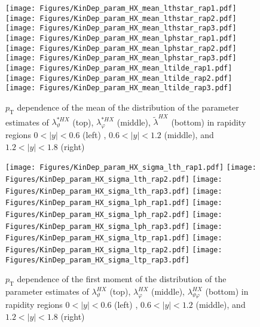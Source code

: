 \documentclass[12pt]{article}
\newcommand{\pT}{p_\mathrm{T}}
\newcommand{\absy}{\left |  y \right |}
\newcommand{\lamthHX}{\lambda^{\scriptscriptstyle HX}_\vartheta}
\newcommand{\lamphHX}{\lambda^{\scriptscriptstyle HX}_\varphi}
\newcommand{\lamthphHX}{\lambda^{\scriptscriptstyle HX}_{\vartheta \varphi}}
\newcommand{\lamtildeHX}{\tilde{\lambda}^{\scriptscriptstyle HX}}
\newcommand{\lamthstarHX}{\lambda^{* \scriptscriptstyle HX}_\vartheta}
\newcommand{\lamphstarHX}{\lambda^{* \scriptscriptstyle HX}_\varphi}
\begin{document}
\begin{figure}[htbp]
\centering
\texttt{[image: Figures/KinDep\_param\_HX\_mean\_lthstar\_rap1.pdf]}
\texttt{[image: Figures/KinDep\_param\_HX\_mean\_lthstar\_rap2.pdf]}
\texttt{[image: Figures/KinDep\_param\_HX\_mean\_lthstar\_rap3.pdf]}
\texttt{[image: Figures/KinDep\_param\_HX\_mean\_lphstar\_rap1.pdf]}
\texttt{[image: Figures/KinDep\_param\_HX\_mean\_lphstar\_rap2.pdf]}
\texttt{[image: Figures/KinDep\_param\_HX\_mean\_lphstar\_rap3.pdf]}
\texttt{[image: Figures/KinDep\_param\_HX\_mean\_ltilde\_rap1.pdf]}
\texttt{[image: Figures/KinDep\_param\_HX\_mean\_ltilde\_rap2.pdf]}
\texttt{[image: Figures/KinDep\_param\_HX\_mean\_ltilde\_rap3.pdf]}
\caption{$\pT$ dependence of the mean of the distribution of the parameter estimates of $\lamthstarHX$ (top), $\lamphstarHX$ (middle), $\lamtildeHX$ (bottom) in rapidity regions $0<\absy<0.6$ (left) , $0.6<\absy<1.2$ (middle), and $1.2<\absy<1.8$ (right)}
\end{figure}
\clearpage


\begin{figure}[htbp]
\centering
\texttt{[image: Figures/KinDep\_param\_HX\_sigma\_lth\_rap1.pdf]}
\texttt{[image: Figures/KinDep\_param\_HX\_sigma\_lth\_rap2.pdf]}
\texttt{[image: Figures/KinDep\_param\_HX\_sigma\_lth\_rap3.pdf]}
\texttt{[image: Figures/KinDep\_param\_HX\_sigma\_lph\_rap1.pdf]}
\texttt{[image: Figures/KinDep\_param\_HX\_sigma\_lph\_rap2.pdf]}
\texttt{[image: Figures/KinDep\_param\_HX\_sigma\_lph\_rap3.pdf]}
\texttt{[image: Figures/KinDep\_param\_HX\_sigma\_ltp\_rap1.pdf]}
\texttt{[image: Figures/KinDep\_param\_HX\_sigma\_ltp\_rap2.pdf]}
\texttt{[image: Figures/KinDep\_param\_HX\_sigma\_ltp\_rap3.pdf]}
\caption{$\pT$ dependence of the first moment of the distribution of the parameter estimates of $\lamthHX$ (top), $\lamphHX$ (middle), $\lamthphHX$ (bottom) in rapidity regions $0<\absy<0.6$ (left) , $0.6<\absy<1.2$ (middle), and $1.2<\absy<1.8$ (right)}
\end{figure}
\clearpage
\end{document}
